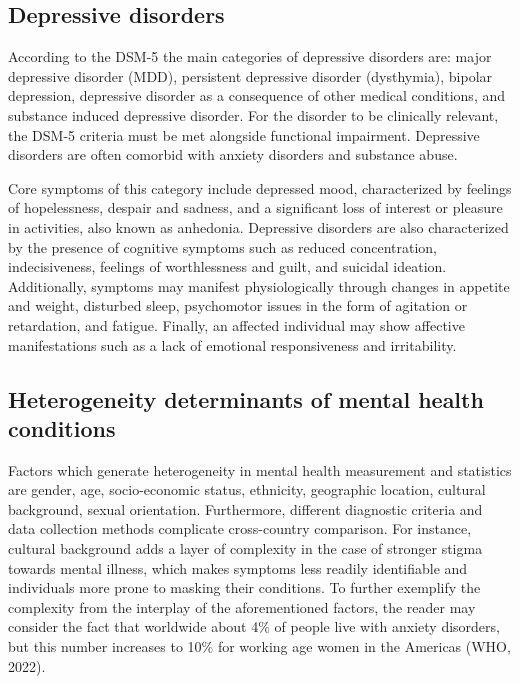         \subsection{Depressive disorders}
            According to the DSM-5 the main categories of depressive disorders are: major depressive disorder (MDD), persistent depressive disorder (dysthymia), bipolar depression, depressive disorder as a consequence of other medical conditions, and substance induced depressive disorder. For the disorder to be clinically relevant, the DSM-5 criteria must be met alongside functional impairment.
            Depressive disorders are often comorbid with anxiety disorders and substance abuse. 

            Core symptoms of this category include depressed mood, characterized by feelings of hopelessness, despair and sadness, and a significant loss of interest or pleasure in activities, also known as anhedonia. Depressive disorders are also characterized by the presence of cognitive symptoms such as reduced concentration, indecisiveness, feelings of worthlessness and guilt, and suicidal ideation. Additionally, symptoms may manifest physiologically through changes in appetite and weight, disturbed sleep, psychomotor issues in the form of agitation or retardation, and fatigue. Finally, an affected individual may show affective manifestations such as a lack of emotional responsiveness and irritability. 


    \subsection{Heterogeneity determinants of mental health conditions}
        Factors which generate heterogeneity in mental health measurement and statistics are gender, age, socio-economic status, ethnicity, geographic location, cultural background, sexual orientation. Furthermore, different diagnostic criteria and data collection methods complicate cross-country comparison. 
        For instance, cultural background adds a layer of complexity in the case of stronger stigma towards mental illness, which makes symptoms less readily identifiable and individuals more prone to masking their conditions.  
        To further exemplify the complexity from the interplay of the aforementioned factors, the reader may consider the fact that worldwide about 4\% of people live with anxiety disorders, but this number increases to 10\% for working age women in the Americas (WHO, 2022). 
        
